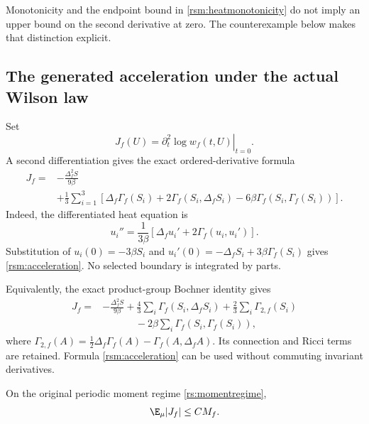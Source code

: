Monotonicity and the endpoint bound in \eqref{rsm:heatmonotonicity} do not imply an upper bound on the second derivative at zero. The counterexample below makes that distinction explicit.

\subsection{The generated acceleration under the actual Wilson law}

Set
\[
 J_f(U)=\left.\partial_t^2\log w_f(t,U)\right|_{t=0}.
\]
A second differentiation gives the exact ordered-derivative formula
\begin{equation}
 \begin{split}
 J_f={}&-\frac{\Delta_f^2S}{9\beta}\\
 &+\frac13\sum_{i=1}^3\left[
       \Delta_f\Gamma_f(S_i)
       +2\Gamma_f(S_i,\Delta_fS_i)
       -6\beta\Gamma_f(S_i,\Gamma_f(S_i))
                    \right].
 \end{split}
 \label{rsm:acceleration}
\end{equation}
Indeed, the differentiated heat equation is
\[
 u_i''=\frac1{3\beta}
          \left[\Delta_fu_i'+2\Gamma_f(u_i,u_i')\right].
\]
Substitution of \(u_i(0)=-3\beta S_i\) and
\(u_i'(0)=-\Delta_fS_i+3\beta\Gamma_f(S_i)\) gives
\eqref{rsm:acceleration}. No selected boundary is integrated by parts.

Equivalently, the exact product-group Bochner identity gives
\[
 \begin{split}
 J_f={}&-\frac{\Delta_f^2S}{9\beta}
      +\frac43\sum_i\Gamma_f(S_i,\Delta_fS_i)
      +\frac23\sum_i\Gamma_{2,f}(S_i)\\
      &\hspace{40pt}-2\beta\sum_i
                          \Gamma_f(S_i,\Gamma_f(S_i)),
 \end{split}
\]
where
\(\Gamma_{2,f}(A)=\frac12\Delta_f\Gamma_f(A)
-\Gamma_f(A,\Delta_fA)\). Its connection and Ricci terms are retained. Formula \eqref{rsm:acceleration} can be used without commuting invariant derivatives.

\begin{proposition}
\label{rsm:accelerationbound}
On the original periodic moment regime \eqref{rs:momentregime},
\begin{equation}
 \E_\mu|J_f|\le CM_f.
 \label{rsm:accelerationestimate}
\end{equation}
\end{proposition}

